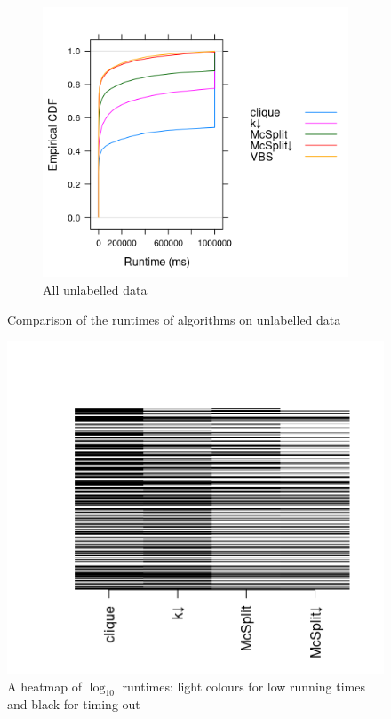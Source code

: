\documentclass{l4proj}
\theoremstyle{definition}
\theoremstyle{remark}
\begin{document}
\begin{figure}
  \begin{subfigure}[t]{\textwidth}
    \centering
    \includegraphics[scale=0.7]{images/ecdf_unlabelled.png}
    \caption{All unlabelled data}
    \label{fig:ecdf_unlabelled_both}
  \end{subfigure}
  \caption{Comparison of the runtimes of algorithms on unlabelled data}
  \label{fig:ecdf_unlabelled}
\end{figure}

\begin{figure} %
  \centering
  \includegraphics{images/runtime_heatmap.png}
  \caption{A heatmap of $\log_{10}$ runtimes: light colours for low running
    times and black for timing out}
  \label{fig:runtime_heatmap}
\end{figure}
\end{document}
